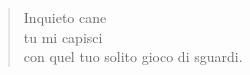 
\begin{verse}
    Inquieto cane\\
    tu mi capisci\\
    con quel tuo solito gioco di sguardi.
\end{verse}